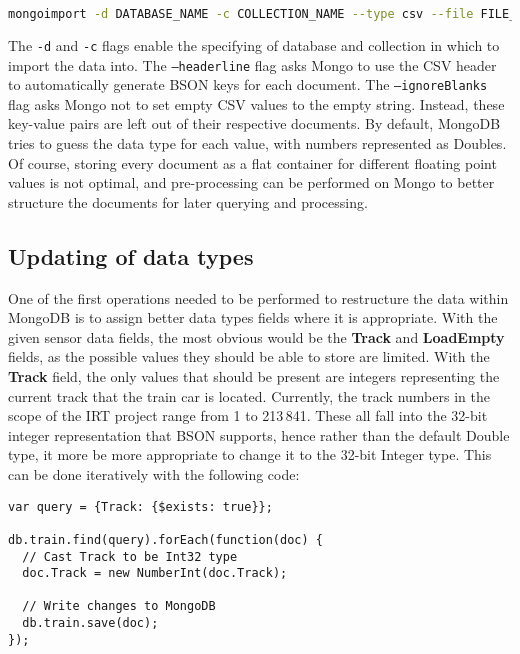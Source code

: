 \documentclass[a4paper,11pt]{article}
\begin{document}
\begin{lstlisting}[language=bash]
mongoimport -d DATABASE_NAME -c COLLECTION_NAME --type csv --file FILE_NAME.csv --headerline --ignoreBlanks
\end{lstlisting}

The \texttt{-d} and \texttt{-c} flags enable the specifying of database and collection in which to
import the data into. The \texttt{--headerline} flag asks Mongo to use the CSV header to automatically generate BSON
keys for each document. The \texttt{--ignoreBlanks} flag asks Mongo not to set empty CSV values to the empty string. Instead,
these key-value pairs are left out of their respective documents.
By default, MongoDB tries to guess the data type for each value, with numbers represented as Doubles.
Of course, storing every document as a flat container for different floating point values is not optimal, and pre-processing
can be performed on Mongo to better structure the documents for later querying and processing.



\subsection{Updating of data types} %
\label{sub:restructuring_of_data}

One of the first operations needed to be performed to restructure the data within MongoDB is to assign better data types
fields where it is appropriate. With the given sensor data fields, the most obvious would be the \textbf{Track} and
\textbf{LoadEmpty} fields, as the possible values they should be able to store are limited. With the \textbf{Track} field,
the only values that should be present are integers representing the current track that the train car is located. Currently,
the track numbers in the scope of the IRT project range from 1 to 213\,841. These all fall into the 32-bit integer representation
that BSON supports, hence rather than the default Double type, it more be more appropriate to change it to the 32-bit Integer
type. This can be done iteratively with the following code:

\begin{lstlisting}[caption=Performing an iterative operation on database collection ``train''.]
var query = {Track: {$exists: true}};

db.train.find(query).forEach(function(doc) {
  // Cast Track to be Int32 type
  doc.Track = new NumberInt(doc.Track);

  // Write changes to MongoDB
  db.train.save(doc);
});
\end{lstlisting}
\end{document}
